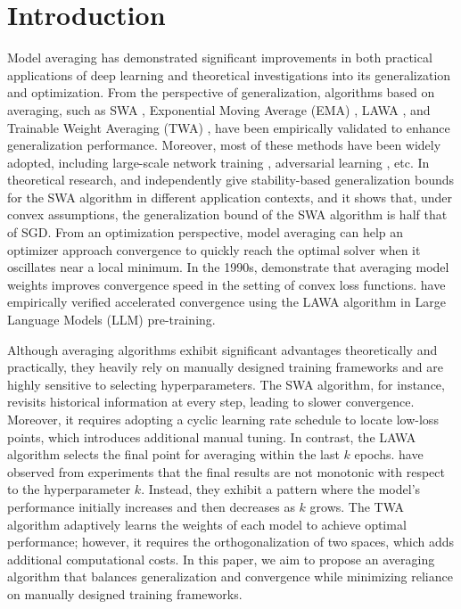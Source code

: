 \section{Introduction}
\label{sec:Intro}

Model averaging has demonstrated significant improvements in both practical applications of deep learning and theoretical investigations into its generalization and optimization. From the perspective of generalization, algorithms based on averaging, such as SWA \cite{izmailov2018averaging}, Exponential Moving Average (EMA) \cite{szegedy2016rethinking}, LAWA \citep{kaddour2022stop,sanyal2023early}, and Trainable Weight Averaging (TWA) \citep{li2022trainable}, have been empirically validated to enhance generalization performance. Moreover, most of these methods have been widely adopted, including large-scale network training \citep{izmailov2018averaging,lu2022improving,sanyal2023early}, adversarial learning \citep{xiao2022stability}, etc. In theoretical research, \citet{hardt2016train} and \citet{xiao2022stability} independently give stability-based generalization bounds for the SWA algorithm in different application contexts, and it shows that, under convex assumptions, the generalization bound of the SWA algorithm is half that of SGD. From an optimization perspective, model averaging can help an optimizer approach convergence to quickly reach the optimal solver when it oscillates near a local minimum. In the 1990s, \citet{polyak1992acceleration} demonstrate that averaging model weights improves convergence speed in the setting of convex loss functions. \citet{sanyal2023early} have empirically verified accelerated convergence using the LAWA algorithm in Large Language Models (LLM) pre-training.

Although averaging algorithms exhibit significant advantages theoretically and practically, they heavily rely on manually designed training frameworks and are highly sensitive to selecting hyperparameters. The SWA algorithm, for instance, revisits historical information at every step, leading to slower convergence. Moreover, it requires adopting a cyclic learning rate schedule to locate low-loss points, which introduces additional manual tuning. In contrast, the LAWA algorithm selects the final point for averaging within the last $k$ epochs. \citet{sanyal2023early} have observed from experiments that the final results are not monotonic with respect to the hyperparameter $k$. Instead, they exhibit a pattern where the model's performance initially increases and then decreases as $k$ grows. The TWA algorithm adaptively learns the weights of each model to achieve optimal performance; however, it requires the orthogonalization of two spaces, which adds additional computational costs. In this paper, we aim to propose an averaging algorithm that balances generalization and convergence while minimizing reliance on manually designed training frameworks.

